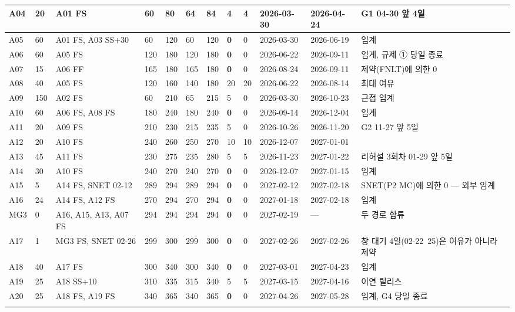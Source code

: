 \documentclass[10pt,a4paper]{article}
\begin{document}
{\begin{longtable}{|L{12mm}|C{12mm}|L{30mm}|C{11mm}|C{11mm}|C{11mm}|C{11mm}|C{11mm}|C{11mm}|C{24mm}|C{24mm}|L{68mm}|}
A04 & 20 & A01 FS & 60 & 80 & 64 & 84 & 4 & 4 & 2026-03-30 & 2026-04-24 & G1 04-30 앞 4일 \\ \hline
A05 & 60 & A01 FS, A03 SS+30 & 60 & 120 & 60 & 120 & \textbf{0} & 0 & 2026-03-30 & 2026-06-19 & 임계 \\ \hline
A06 & 60 & A05 FS & 120 & 180 & 120 & 180 & \textbf{0} & 0 & 2026-06-22 & 2026-09-11 & 임계, 규제 ① 당일 종료 \\ \hline
A07 & 15 & A06 FF & 165 & 180 & 165 & 180 & \textbf{0} & 0 & 2026-08-24 & 2026-09-11 & 제약(FNLT)에 의한 0 \\ \hline
A08 & 40 & A05 FS & 120 & 160 & 140 & 180 & 20 & 20 & 2026-06-22 & 2026-08-14 & 최대 여유 \\ \hline
A09 & 150 & A02 FS & 60 & 210 & 65 & 215 & 5 & 0 & 2026-03-30 & 2026-10-23 & 근접 임계 \\ \hline
A10 & 60 & A06 FS, A08 FS & 180 & 240 & 180 & 240 & \textbf{0} & 0 & 2026-09-14 & 2026-12-04 & 임계 \\ \hline
A11 & 20 & A09 FS & 210 & 230 & 215 & 235 & 5 & 0 & 2026-10-26 & 2026-11-20 & G2 11-27 앞 5일 \\ \hline
A12 & 20 & A10 FS & 240 & 260 & 250 & 270 & 10 & 10 & 2026-12-07 & 2027-01-01 & \\ \hline
A13 & 45 & A11 FS & 230 & 275 & 235 & 280 & 5 & 5 & 2026-11-23 & 2027-01-22 & 리허설 3회차 01-29 앞 5일 \\ \hline
A14 & 30 & A10 FS & 240 & 270 & 240 & 270 & \textbf{0} & 0 & 2026-12-07 & 2027-01-15 & 임계 \\ \hline
A15 & 5 & A14 FS, SNET 02-12 & 289 & 294 & 289 & 294 & \textbf{0} & 0 & 2027-02-12 & 2027-02-18 & SNET(P2 MC)에 의한 0 — 외부 임계 \\ \hline
A16 & 24 & A14 FS, A12 FS & 270 & 294 & 270 & 294 & \textbf{0} & 0 & 2027-01-18 & 2027-02-18 & 임계 \\ \hline
MG3 & 0 & A16, A15, A13, A07 FS & 294 & 294 & 294 & 294 & \textbf{0} & 0 & 2027-02-19 & — & 두 경로 합류 \\ \hline
A17 & 1 & MG3 FS, SNET 02-26 & 299 & 300 & 299 & 300 & \textbf{0} & 0 & 2027-02-26 & 2027-02-26 & 창 대기 4일(02-22~25)은 여유가 아니라 제약 \\ \hline
A18 & 40 & A17 FS & 300 & 340 & 300 & 340 & \textbf{0} & 0 & 2027-03-01 & 2027-04-23 & 임계 \\ \hline
A19 & 25 & A18 SS+10 & 310 & 335 & 315 & 340 & 5 & 5 & 2027-03-15 & 2027-04-16 & 이연 릴리스 \\ \hline
A20 & 25 & A18 FS, A19 FS & 340 & 365 & 340 & 365 & \textbf{0} & 0 & 2027-04-26 & 2027-05-28 & 임계, G4 당일 종료 \\ \hline
\fi
\end{longtable}}
\end{document}
